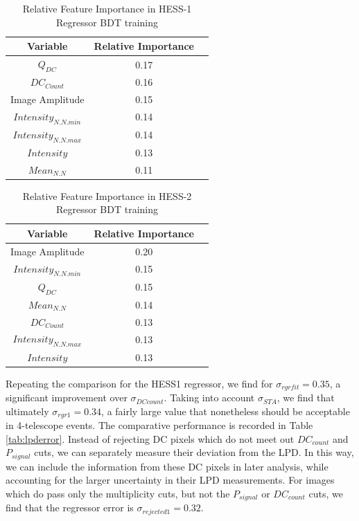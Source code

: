 \documentclass{article}
\begin{document}
\begin{table}[h!]
  \centering
  \caption{Relative Feature Importance in HESS-1 Regressor BDT training}
  \label{tab:hess1regressor}
  \begin{tabular}{ccc}
    \toprule
    Variable & Relative Importance\\
    \midrule
    $Q_{DC}$ & 0.17\\
    $DC_{Count}$ & 0.16\\
    Image Amplitude & 0.15\\
    $Intensity_{N.N.min}$ & 0.14\\
    $Intensity_{N.N.max}$ & 0.14\\
    $Intensity$ & 0.13\\
    $Mean_{N.N}$ & 0.11\\
    \bottomrule
  \end{tabular}
\end{table}

\begin{table}[h!]
  \centering
  \caption{Relative Feature Importance in HESS-2 Regressor BDT training}
  \label{tab:hess2regressor}
  \begin{tabular}{ccc}
    \toprule
    Variable & Relative Importance\\
    \midrule
    Image Amplitude & 0.20\\
    $Intensity_{N.N.min}$ & 0.15\\
    $Q_{DC}$ & 0.15\\
    $Mean_{N.N}$ & 0.14\\
    $DC_{Count}$ & 0.13\\
    $Intensity_{N.N.max}$ & 0.13\\
    $Intensity$ & 0.13\\
    \bottomrule
  \end{tabular}
\end{table} 

Repeating the comparison for the HESS1 regressor, we find for $\sigma_{rgrfit} = 0.35$, a significant improvement over $\sigma_{DCcount}$. Taking into account $\sigma_{STA}$, we find that ultimately $\sigma_{rgr1}=0.34$, a fairly large value that nonetheless should be acceptable in 4-telescope events. The comparative performance is recorded in Table \ref{tab:lpderror}. Instead of rejecting DC pixels which do not meet out $DC_{count}$ and $P_{signal}$ cuts, we can separately measure their deviation from the LPD. In this way, we can include the information from these DC pixels in later analysis, while accounting for the larger uncertainty in their LPD measurements. For images which do pass only the multiplicity cuts, but not the $P_{signal}$ or $DC_{count}$ cuts, we find that the regressor error is $\sigma_{rejected1}=0.32$. 
\end{document}
